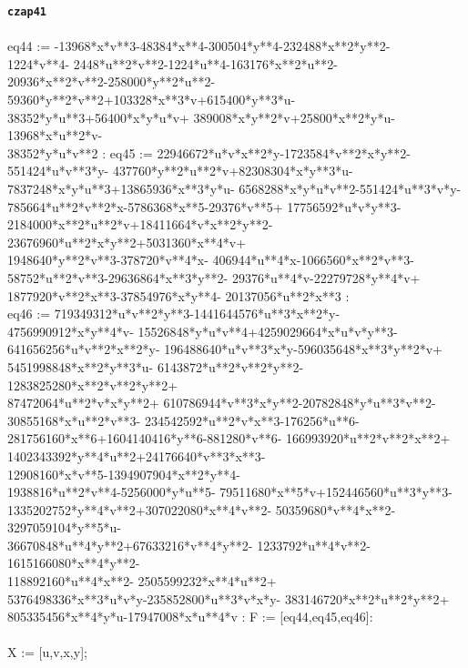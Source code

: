\documentclass[letterpaper,12pt,titlepage,oneside,final]{book}
\newenvironment{codefont}{\footnotesize\ttfamily}{\par}
\begin{document}
\begin{appendices}
\noindent\textbf{\texttt{czap41}}\\\\
\noindent\begin{codefont}
 eq44 := -13968*x*v**3-48384*x**4-300504*y**4-232488*x**2*y**2-\\1224*v**4-
2448*u**2*v**2-1224*u**4-163176*x**2*u**2-\\20936*x**2*v**2-258000*y**2*u**2-
59360*y**2*v**2+103328*x**3*v+615400*y**3*u-\\38352*y*u**3+56400*x*y*u*v+
389008*x*y**2*v+25800*x**2*y*u-13968*x*u**2*v-\\38352*y*u*v**2 :
eq45 := 22946672*u*v*x**2*y-1723584*v**2*x*y**2-\\551424*u*v**3*y-
437760*y**2*u**2*v+82308304*x*y**3*u-\\7837248*x*y*u**3+13865936*x**3*y*u-
6568288*x*y*u*v**2-551424*u**3*v*y-\\785664*u**2*v**2*x-5786368*x**5-29376*v**5+
17756592*u*v*y**3-\\2184000*x**2*u**2*v+18411664*v*x**2*y**2-
23676960*u**2*x*y**2+5031360*x**4*v+\\1948640*y**2*v**3-378720*v**4*x-
406944*u**4*x-1066560*x**2*v**3-\\58752*u**2*v**3-29636864*x**3*y**2-
29376*u**4*v-22279728*y**4*v+\\1877920*v**2*x**3-37854976*x*y**4-
20137056*u**2*x**3 :\\
eq46 := 719349312*u*v**2*y**3-1441644576*u**3*x**2*y-\\4756990912*x*y**4*v-
15526848*y*u*v**4+4259029664*x*u*v*y**3-\\641656256*u*v**2*x**2*y-
196488640*u*v**3*x*y-596035648*x**3*y**2*v+\\5451998848*x**2*y**3*u-
6143872*u**2*v**2*y**2-1283825280*x**2*v**2*y**2+\\87472064*u**2*v*x*y**2+
610786944*v**3*x*y**2-20782848*y*u**3*v**2-\\30855168*x*u**2*v**3-
234542592*u**2*v*x**3-176256*u**6-\\281756160*x**6+1604140416*y**6-881280*v**6-
166993920*u**2*v**2*x**2+\\1402343392*y**4*u**2+24176640*v**3*x**3-\\
12908160*x*v**5-1394907904*x**2*y**4-\\1938816*u**2*v**4-5256000*y*u**5-
79511680*x**5*v+152446560*u**3*y**3-\\1335202752*y**4*v**2+307022080*x**4*v**2-
50359680*v**4*x**2-3297059104*y**5*u-\\36670848*u**4*y**2+67633216*v**4*y**2-
1233792*u**4*v**2-1615166080*x**4*y**2-\\118892160*u**4*x**2-
2505599232*x**4*u**2+\\5376498336*x**3*u*v*y-235852800*u**3*v*x*y-
383146720*x**2*u**2*y**2+\\805335456*x**4*y*u-17947008*x*u**4*v :
F := [eq44,eq45,eq46]:\\
\\
X := [u,v,x,y];\\
\end{codefont}


\end{appendices}
\end{document}
